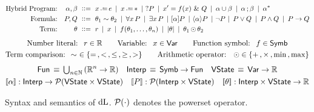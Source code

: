 \newcommand{\dLTermCompDefs}{\sim\  \in \{= \BnfOpSep < \BnfOpSep \le \BnfOpSep \ge \BnfOpSep >\}}
\newcommand{\dLBinopDefs}{\AnyBinOp \in \{+ \BnfOpSep \times \BnfOpSep \min \BnfOpSep \max\}}

\begin{figure}
  \EquationsFigureSize
  \begin{align*}
    \text{Hybrid Program:}&&
    \alpha,\beta &\BnfDef
      x \dlassign e \BnfOr
      x \dlassign * \BnfOr
      ?P \BnfOr
      x'=f(x) \dldom Q \BnfOr
      \alpha \cup \beta \BnfOr
      \alpha \seqI \beta \BnfOr
    \alpha^* \\
    \text{Formula:}&&
    P, Q &\BnfDef
      \theta_1 \sim \theta_2 \BnfOr
      \lforall x P \BnfOr
      \lexists x P \BnfOr
      \lboxI{\alpha}{P} \BnfOr
      \ldiamondI{\alpha}{P} \BnfOr
      \!\lnot P\! \BnfOr
      P \lor Q \BnfOr
      P \land Q \BnfOr
      P \limplyI Q \\
    \text{Term:}&&
    \theta &\BnfDef
      r \BnfOr x \BnfOr f(\theta_1,\dots,\theta_n) \BnfOr |\theta| \BnfOr
      \theta_1 \AnyBinOp \theta_2
  \end{align*}
  \begin{gather*}
  \text{Number literal: \ } r \in \Reals \qquad
  \text{Variable: \ } x \in \VarsAll \qquad
  \text{Function symbol: \ } f \in \SymbsAll \\
  \text{Term comparison: } \dLTermCompDefs \qquad
  \text{Arithmetic operator: \ } \dLBinopDefs
  \end{gather*}
  \begin{gather*}
    \Funs \,\equiv\, {\textstyle \bigcup_{n \in \Nats}} \, (\Reals^n \to \Reals) \quad
    \InterpsAll \,\equiv\, \SymbsAll \to \Funs \quad
    \StatesAll \,\equiv\, \VarsAll \to \Reals \\
    \sem{\alpha} : \InterpsAll \to \Subsets{\StatesAll \times \StatesAll} \quad
    \sem{P} : \Subsets{\InterpsAll \times \StatesAll} \quad
    \sem{\theta} : \InterpsAll \times \StatesAll \to \Reals
  \end{gather*}
  \vspace{-0.4cm}
  \caption{Syntax and semantics of $\mathop{}\!\mathrm{d} \text{L}$. $\mathcal{P}(\cdot)$ denotes the powerset operator.}\label{fig:dl-syntax-semantics}
  \Description[]{}
\end{figure}

